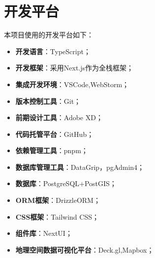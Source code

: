 \section{开发平台}
本项目使用的开发平台如下：
\begin{itemize}
    \item \textbf{开发语言}：TypeScript；
    \item \textbf{开发框架}：采用Next.js作为全栈框架；
    \item \textbf{集成开发环境}：VSCode,WebStorm；
    \item \textbf{版本控制工具}：Git；
    \item \textbf{前期设计工具}：Adobe XD；
    \item \textbf{代码托管平台}：GitHub；
    \item \textbf{依赖管理工具}：pnpm；
    \item \textbf{数据库管理工具}：DataGrip，pgAdmin4；
    \item \textbf{数据库}：PostgreSQL+PostGIS；
    \item \textbf{ORM框架}：DrizzleORM；
    \item \textbf{CSS框架}：Tailwind CSS；
    \item \textbf{组件库}：NextUI；
    \item \textbf{地理空间数据可视化平台}：Deck.gl,Mapbox；
\end{itemize}
